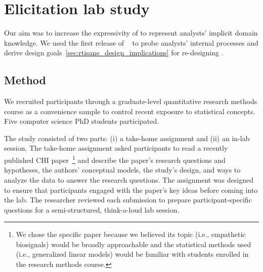 \def\unit{\texttt{Unit}\xspace}
\def\measure{\texttt{Measure}\xspace}
\def\setup{\texttt{SetUp}\xspace}

\section{Elicitation lab study} \label{sec:exploratoryStudy}
 Our aim was to increase the expressivity of \rTisane to
represent analysts' implicit domain knowledge. We used the first release of
\tisane~\cite{jun2022tisane} to probe analysts' internal processes and derive
design goals~\autoref{sec:rtisane_design_implications} for re-designing \tisane.

\subsection{Method}
We recruited participants through a graduate-level quantitative research methods
course as a convenience sample to control recent exposure to
statistical concepts. Five computer science PhD students participated.

The study consisted of two parts: (i) a take-home assignment and (ii) an in-lab
session. The take-home assignment asked participants to read a recently
published CHI paper~\cite{winters2021heartbeat}\footnote{We chose the specific
paper because we believed its topic (i.e., empathetic biosignals) would be
broadly approachable and the statistical methods used (i.e., generalized linear
models) would be familiar with students enrolled in the research methods
course.} and describe the paper's research questions and hypotheses, the
authors' conceptual models, the study's design, and ways to analyze the data to
answer the research questions. The assignment was designed to ensure that
participants engaged with the paper's key ideas before coming into the lab. The
researcher reviewed each submission to prepare participant-specific questions
for a semi-structured, think-a-loud lab session. 

